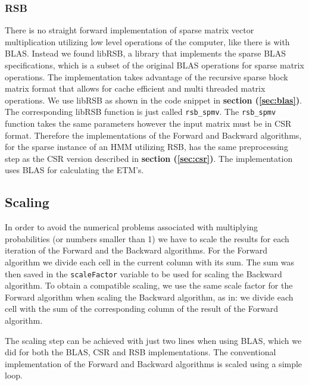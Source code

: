 \subsubsection{RSB}
There is no straight forward implementation of sparse matrix vector multiplication utilizing low level operations of the computer, like there is with BLAS. Instead we found libRSB\cite{librsb}, a library that implements the sparse BLAS specifications, which is a subset of the original BLAS operations for sparse matrix operations. The implementation takes advantage of the recursive sparse block matrix format that allows for cache efficient and multi threaded matrix operations. We use libRSB as shown in the code snippet in \textbf{section (\ref{sec:blas})}. The corresponding libRSB function is just called \texttt{rsb\_spmv}. The \texttt{rsb\_spmv} function takes the same parameters however the input matrix must be in CSR format. Therefore the implementations of the Forward and Backward algorithms, for the sparse instance of an HMM utilizing RSB, has the same preprocessing step as the CSR version described in \textbf{section (\ref{sec:csr})}. The  implementation uses BLAS for calculating the ETM's.

\subsection{Scaling}
In order to avoid the numerical problems associated with multiplying probabilities (or numbers smaller than 1) we have to scale the results for each iteration of the Forward and the Backward algorithms. For the Forward algorithm we divide each cell in the current column with its sum. The sum was then saved in the \texttt{scaleFactor} variable to be used for scaling the Backward algorithm. To obtain a compatible scaling, we use the same scale factor for the Forward algorithm when scaling the Backward algorithm, as in: we divide each cell with the sum of the corresponding column of the result of the Forward algorithm.

The scaling step can be achieved with just two lines when using BLAS, which we did for both the BLAS, CSR and RSB implementations. The conventional implementation of the Forward and Backward algorithms is scaled using a simple loop.
